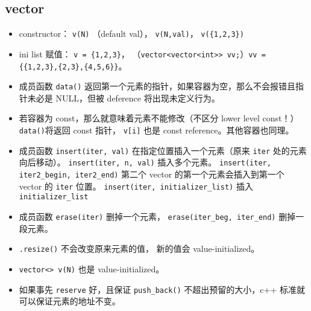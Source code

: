 \subsection{vector}
\begin{itemize}
\item constructor： \verb`v(N)` （default val）， \verb`v(N,val)`， \verb`v({1,2,3})`
\item ini list 赋值： \verb`v = {1,2,3}`， （\verb`vector<vector<int>> vv;`）\verb`vv = {{1,2,3},{2,3},{4,5,6}}`。
\item 成员函数 \verb`data()` 返回第一个元素的指针，如果容器为空，那么不会报错且指针未必是 NULL，但被 deference 将出现未定义行为。
\item 若容器为 const，那么就意味着元素不能修改（不区分 lower level const！） \verb`data()`将返回 const 指针， \verb`v[i]` 也是 const reference。其他容器也同理。
\item 成员函数 \verb`insert(iter, val)` 在指定位置插入一个元素（原来 \verb`iter` 处的元素向后移动）。 \verb`insert(iter, n, val)` 插入多个元素。 \verb`insert(iter, iter2_begin, iter2_end)` 第二个 vector 的第一个元素会插入到第一个 vector 的 \verb`iter` 位置。 \verb`insert(iter, initializer_list)` 插入 \verb`initializer_list`
\item 成员函数 \verb`erase(iter)` 删掉一个元素， \verb`erase(iter_beg, iter_end)` 删掉一段元素。
\item \verb`.resize()` 不会改变原来元素的值， 新的值会 value-initialized。
\item \verb`vector<> v(N)` 也是 value-initialized。
\item 如果事先 \verb`reserve` 好，且保证 \verb`push_back()` 不超出预留的大小，c++ 标准就可以保证元素的地址不变。
\end{itemize}

